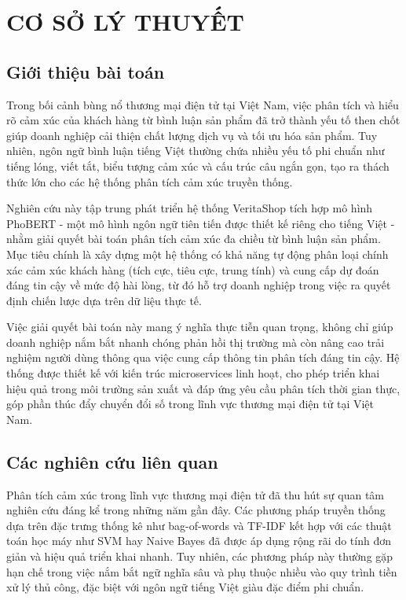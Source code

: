 \newpage
%
%
\section{CƠ SỞ LÝ THUYẾT}\label{sec:theory_support}
\subsection{Giới thiệu bài toán}

Trong bối cảnh bùng nổ thương mại điện tử tại Việt Nam, việc phân tích và hiểu rõ cảm xúc của khách hàng từ bình luận sản phẩm đã trở thành yếu tố then chốt giúp doanh nghiệp cải thiện chất lượng dịch vụ và tối ưu hóa sản phẩm. Tuy nhiên, ngôn ngữ bình luận tiếng Việt thường chứa nhiều yếu tố phi chuẩn như tiếng lóng, viết tắt, biểu tượng cảm xúc và cấu trúc câu ngắn gọn, tạo ra thách thức lớn cho các hệ thống phân tích cảm xúc truyền thống.

Nghiên cứu này tập trung phát triển hệ thống VeritaShop tích hợp mô hình PhoBERT - một mô hình ngôn ngữ tiên tiến được thiết kế riêng cho tiếng Việt - nhằm giải quyết bài toán phân tích cảm xúc đa chiều từ bình luận sản phẩm. Mục tiêu chính là xây dựng một hệ thống có khả năng tự động phân loại chính xác cảm xúc khách hàng (tích cực, tiêu cực, trung tính) và cung cấp dự đoán đáng tin cậy về mức độ hài lòng, từ đó hỗ trợ doanh nghiệp trong việc ra quyết định chiến lược dựa trên dữ liệu thực tế.

Việc giải quyết bài toán này mang ý nghĩa thực tiễn quan trọng, không chỉ giúp doanh nghiệp nắm bắt nhanh chóng phản hồi thị trường mà còn nâng cao trải nghiệm người dùng thông qua việc cung cấp thông tin phân tích đáng tin cậy. Hệ thống được thiết kế với kiến trúc microservices linh hoạt, cho phép triển khai hiệu quả trong môi trường sản xuất và đáp ứng yêu cầu phân tích thời gian thực, góp phần thúc đẩy chuyển đổi số trong lĩnh vực thương mại điện tử tại Việt Nam.
\subsection{Các nghiên cứu liên quan}

Phân tích cảm xúc trong lĩnh vực thương mại điện tử đã thu hút sự quan tâm nghiên cứu đáng kể trong những năm gần đây. Các phương pháp truyền thống dựa trên đặc trưng thống kê như bag-of-words và TF-IDF kết hợp với các thuật toán học máy như SVM hay Naive Bayes đã được áp dụng rộng rãi do tính đơn giản và hiệu quả triển khai nhanh. Tuy nhiên, các phương pháp này thường gặp hạn chế trong việc nắm bắt ngữ nghĩa sâu và phụ thuộc nhiều vào quy trình tiền xử lý thủ công, đặc biệt với ngôn ngữ tiếng Việt giàu đặc điểm phi chuẩn.

